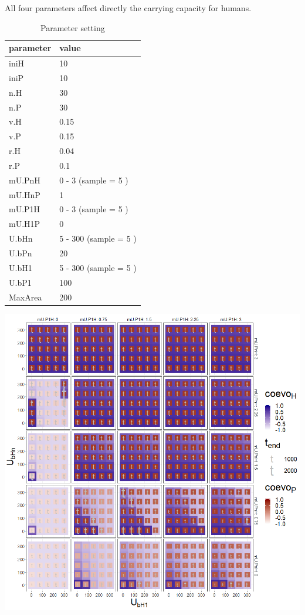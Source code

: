 \documentclass[
]{book}
\begin{document}

All four parameters affect directly the carrying capacity for humans.

\begin{table}[!h]

\caption{\label{tab:4UbHUPHtablepdf}Parameter setting}
\centering
\begin{tabular}[t]{l|l}
\hline
parameter & value\\
\hline
iniH & 10\\
\hline
iniP & 10\\
\hline
n.H & 30\\
\hline
n.P & 30\\
\hline
v.H & 0.15\\
\hline
v.P & 0.15\\
\hline
r.H & 0.04\\
\hline
r.P & 0.1\\
\hline
mU.PnH & 0 - 3 (sample = 5 )\\
\hline
mU.HnP & 1\\
\hline
mU.P1H & 0 - 3 (sample = 5 )\\
\hline
mU.H1P & 0\\
\hline
U.bHn & 5 - 300 (sample = 5 )\\
\hline
U.bPn & 20\\
\hline
U.bH1 & 5 - 300 (sample = 5 )\\
\hline
U.bP1 & 100\\
\hline
MaxArea & 200\\
\hline
\end{tabular}
\end{table}

\newpage

\includegraphics[width=1\linewidth]{plots/4_fourPar-U.bH-U.PH_plot}
\end{document}
